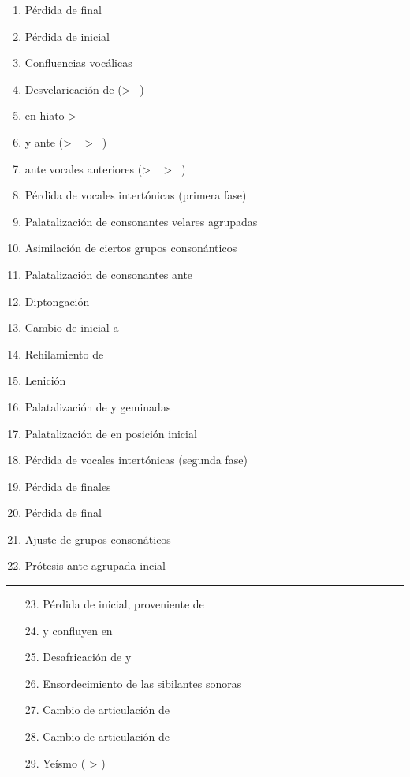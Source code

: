\documentclass[12pt]{article}
\begin{document}
{\large{
\begin{enumerate}
\itemsep=.5mm
	\item Pérdida de \textipa{[m]} final
	\item Pérdida de \textipa{[h]} inicial
	\item Confluencias vocálicas
	\item Desvelaricación de \textipa{[w]} (> \ \textipa{[B]})
	\item {\textipa{[e]}} en hiato > \ \textipa{[j]}
	\item {\textipa{[t]}} y \textipa{[k]} ante \textipa{[j]} (> \ \textipa{[\textteshlig]} > \ \textipa{[ts]})
	\item {\textipa{[k]}} ante vocales anteriores (> \ \textipa{[\textteshlig]} > \ \textipa{[ts]})
	\item Pérdida de vocales intertónicas (primera fase)
	\item Palatalización de consonantes velares agrupadas
	\item Asimilación de ciertos grupos consonánticos
	\item Palatalización de consonantes ante \textipa{[j]}
	\item Diptongación
	\item Cambio de \textipa{[f]} inicial a \textipa{[h]}
	\item Rehilamiento de 
	\item Lenición
	\item Palatalización de \textipa{[l]} y \textipa{[n]} geminadas
	\item Palatalización de \textipa{[kl], [pl], [fl]} en posición inicial
	\item Pérdida de vocales intertónicas (segunda fase)
	\item Pérdida de \textipa{[t], [d], [k]} finales
	\item Pérdida de \textipa{[e]} final
	\item Ajuste de grupos consonáticos
	\item Prótesis ante \textipa{[s]} agrupada incial
\end{enumerate}

\hrule

\begin{enumerate}
	\item[23.] Pérdida de \textipa{[h]} inicial, proveniente de \textipa{[f]}
	\item[24.]  y \textipa{/\textbeta/} confluyen en   
	\item[25.] Desafricación de \textipa{[ts]} y \textipa{[dz]}  
	\item[26.] Ensordecimiento de las sibilantes sonoras  
	\item[27.] Cambio de articulación de \textipa{[\c{s}]}  
	\item[28.] Cambio de articulación de \textipa{[\textesh]} 
	\item[29.] Yeísmo (\textipa{/\textturny/} > \textipa{/\textctj/})
\end{enumerate}
}}
\end{document}
